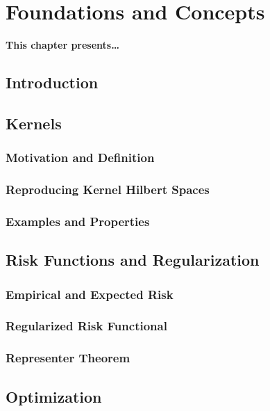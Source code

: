 
\chapter{Foundations and Concepts} %
\label{Chapter2}

{\bf \small{
This chapter presents\dots
}}

\section{Introduction}

\section{Kernels}
\subsection{Motivation and Definition}
\subsection{Reproducing Kernel Hilbert Spaces}
\subsection{Examples and Properties}

\section{Risk Functions and Regularization}
\subsection{Empirical and Expected Risk}
\subsection{Regularized Risk Functional}
\subsection{Representer Theorem}


\section{Optimization}
